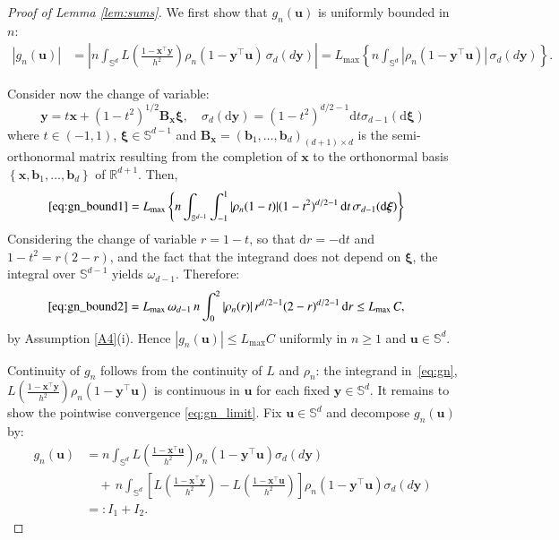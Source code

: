 \documentclass[12pt]{report} %
\newcommand{\bx}{\mathbf{x}}
\newcommand{\by}{\mathbf{y}}
\newcommand{\bb}{\boldsymbol{b}}
\newcommand{\bu}{\boldsymbol{u}}
\newcommand{\bxi}{\boldsymbol{\xi}}
\newcommand{\sigmad}{\sigma_{d}}
\newcommand{\sigmadm}{\sigma_{d-1}}
\newcommand{\rd}{\mathrm{d}}
\newcommand{\Sd}{\mathbb{S}^{d}}
\newcommand{\Sdm}{\mathbb{S}^{d-1}}
\newcommand{\bB}{\mathbf{B}}
\begin{document}
\begin{proof}[Proof of Lemma \ref{lem:sums}]
We first show that $g_n(\bu)$ is uniformly bounded in $n$:
\begin{align}
\label{eq:gn_bound1}
|g_n(\bu)| &= \left|n \int_{\Sd} L\!\left(\frac{1-\bx^\top\by}{h^2}\right)
\rho_n(1-\by^\top\bu)\,\sigmad(d\by)\right|
= L_{\max}\left\{n\int_{\Sd}|\rho_n(1-\by^\top\bu)|\,\sigmad(d\by)\right\}.
\end{align}

Consider now the change of variable:
\begin{equation}
    \label{eq:change-var-tg}
    \by=t \bx+\left(1-t^2\right)^{1/2} \bB_{\bx} \bxi, \quad \sigmad(\rd \by)=\left(1-t^2\right)^{d/2-1} \rd t \sigmadm(\rd \bxi)
\end{equation}
where $t \in(-1,1)$, $ \bxi \in \Sdm$ and $\bB_{\bx}=\left(\bb_1, \ldots, \bb_d\right)_{(d+1) \times d}$ is the semi-orthonormal matrix resulting from the completion of $\bx$ to the orthonormal basis $\left\{\bx, \bb_1, \ldots, \bb_d\right\}$ of $\mathbb{R}^{d+1}$. Then,
\begin{align}
    \eqref{eq:gn_bound1} &= L_{\max} \left\{ n \int_{\Sdm} \int_{-1}^{1} 
    |\rho_n(1-t)| (1-t^2)^{d/2-1} \, \rd t \, \sigmadm(\rd \bxi) \right\} \label{eq:gn_bound2}
\end{align}
Considering the change of variable $r = 1 - t$, so that $\rd r = -\rd t$ and $1 - t^2 = r(2-r)$, and  the fact that the integrand does not depend on $\bxi$, the integral over $\Sdm$ yields $\omega_{d-1}$. Therefore:
\begin{align*}
    \eqref{eq:gn_bound2} 
    &= L_{\max} \, \omega_{d-1} \, n \int_{0}^{2} |\rho_n(r)| \, 
    r^{d/2-1}(2-r)^{d/2-1} \, \rd r \leq L_{\max} \, C,
\end{align*}
by Assumption \ref{A4}(i). Hence $|g_n(\bu)| \leq L_{\max} C$ uniformly in $n \geq 1$ and $\bu \in \Sd$.

Continuity of $g_n$ follows from the continuity of $L$ and $\rho_n$: the integrand in~\eqref{eq:gn}, $L\!\left(\frac{1-\bx^\top \by}{h^2}\right)\allowbreak\rho_n\!\left(1 - \by^\top\bu\right)$ is continuous in $\bu$ for each fixed $\by \in \Sd$. It remains to show the pointwise convergence \eqref{eq:gn_limit}. Fix $\bu \in \Sd$ and decompose $g_n(\bu)$ by:
\begin{align}
\label{eq:gn_decomp}
g_n(\bu) 
&= n \int_{\Sd}  L\!\left(\frac{1 - \bx^\top \bu}{h^2}\right) \rho_n\!\left(1 - \by^\top \bu\right) \sigmad(d\by) \nonumber\\
&\quad+ \, n \int_{\Sd} \left[ L\!\left(\frac{1 - \bx^\top \by}{h^2}\right) 
  - L\!\left(\frac{1 - \bx^\top \bu}{h^2}\right)  \right] \rho_n\!\left(1 - \by^\top \bu\right) \sigmad(d\by) \nonumber\\
&=: I_1 + I_2. 
\end{align}


\end{proof}
\end{document}
